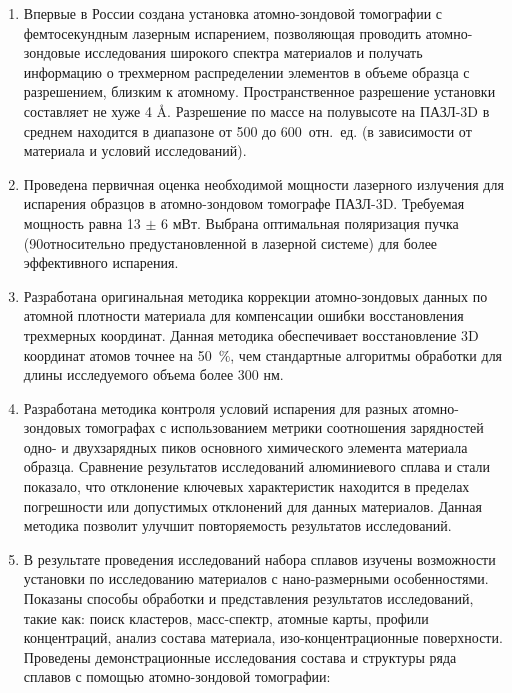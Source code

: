 \begin{enumerate}[beginpenalty=10000]
	\item Впервые в России создана установка атомно-зондовой томографии с фемтосекундным лазерным испарением, позволяющая проводить атомно-зондовые исследования широкого спектра материалов  и получать информацию о трехмерном распределении элементов в объеме образца с разрешением, близким к атомному. Пространственное разрешение установки составляет не хуже 4 \r{A}. Разрешение по массе на полувысоте на ПАЗЛ-3D в среднем находится в диапазоне от 500 до 600~отн.~ед. (в зависимости от материала и условий исследований).
	\item Проведена первичная оценка необходимой мощности лазерного излучения для испарения образцов в атомно-зондовом томографе ПАЗЛ-3D. Требуемая мощность равна 13 $\pm$ 6 мВт. Выбрана оптимальная поляризация пучка (90\textdegree относительно предустановленной в лазерной системе) для более эффективного испарения.
	\item Разработана оригинальная методика коррекции атомно-зондовых данных по атомной плотности материала для компенсации ошибки восстановления трехмерных координат. Данная методика обеспечивает восстановление 3D координат атомов точнее на 50~\%, чем стандартные алгоритмы обработки для длины исследуемого объема более 300 нм.   
	\item Разработана методика контроля условий испарения для разных атомно-зондовых томографах с использованием метрики соотношения зарядностей одно- и двухзарядных пиков основного химического элемента материала образца. Сравнение результатов исследований алюминиевого сплава и стали показало, что отклонение ключевых характеристик находится в пределах погрешности или допустимых отклонений для данных материалов. Данная методика позволит улучшит повторяемость результатов исследований.	
	\item В результате проведения исследований набора сплавов изучены возможности установки по исследованию материалов с нано-размерными особенностями. Показаны способы обработки и представления результатов исследований, такие как: поиск кластеров, масс-спектр, атомные карты, профили концентраций, анализ состава материала, изо-концентрационные поверхности.  Проведены демонстрационные исследования состава и структуры ряда сплавов с помощью атомно-зондовой томографии:

\end{enumerate}
